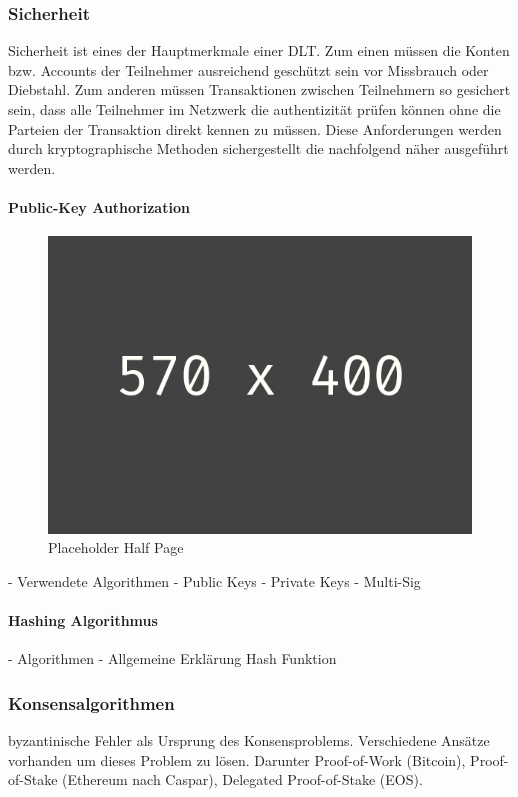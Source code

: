\subsubsection{Sicherheit} \label{tec_bkgrnd_sec}
Sicherheit ist eines der Hauptmerkmale einer DLT. Zum einen müssen die Konten bzw. Accounts der Teilnehmer ausreichend geschützt sein vor Missbrauch oder Diebstahl. Zum anderen müssen Transaktionen zwischen Teilnehmern so gesichert sein, dass alle Teilnehmer im Netzwerk die authentizität prüfen können ohne die Parteien der Transaktion direkt kennen zu müssen. Diese Anforderungen werden durch kryptographische Methoden sichergestellt die nachfolgend näher ausgeführt werden.

\paragraph{Public-Key Authorization}
\begin{figure}[h!]
	\centering
	\includegraphics[width=1.0\linewidth]{pictures/placeholder_half_page}
	\caption[Placeholder Half Page]{Placeholder Half Page}
	\label{fig:placeholder_half_page}
\end{figure}
- Verwendete Algorithmen
- Public Keys
- Private Keys
- Multi-Sig

\paragraph{Hashing Algorithmus}
- Algorithmen
- Allgemeine Erklärung Hash Funktion

\subsubsection{Konsensalgorithmen}
byzantinische Fehler als Ursprung des Konsensproblems. Verschiedene Ansätze vorhanden um dieses Problem zu lösen. Darunter Proof-of-Work (Bitcoin), Proof-of-Stake (Ethereum nach Caspar), Delegated Proof-of-Stake (EOS).


